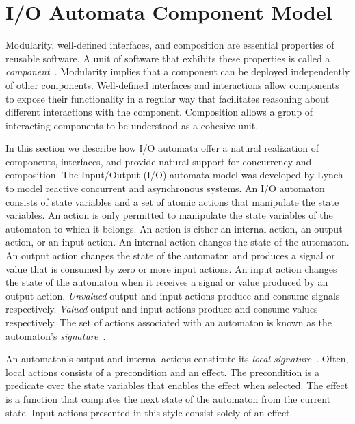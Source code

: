 \section{I/O Automata Component Model\label{system_model}}

Modularity, well-defined interfaces, and composition are essential properties of reusable software.
A unit of software that exhibits these properties is called a \emph{component}~\cite{szyperski2002component}.
Modularity implies that a component can be deployed independently of other components.
Well-defined interfaces and interactions allow components to expose their functionality in a regular way that facilitates reasoning about different interactions with the component.
Composition allows a group of interacting components to be understood as a cohesive unit.

In this section we describe how I/O automata offer a natural realization of components, interfaces, and provide natural support for concurrency and composition.
The Input/Output (I/O) automata model was developed by Lynch~\cite{lynch1996distributed} to model reactive concurrent and asynchronous systems.
An I/O automaton consists of state variables and a set of atomic actions that manipulate the state variables.
An action is only permitted to manipulate the state variables of the automaton to which it belongs.
An action is either an internal action, an output action, or an input action.
An internal action changes the state of the automaton.
An output action changes the state of the automaton and produces a signal or value that is consumed by zero or more input actions.
An input action changes the state of the automaton when it receives a signal or value produced by an output action.
\emph{Unvalued} output and input actions produce and consume signals respectively.
\emph{Valued} output and input actions produce and consume values respectively.
The set of actions associated with an automaton is known as the automaton's \emph{signature}~\cite{lynch1996distributed}.

An automaton's output and internal actions constitute its \emph{local signature}~\cite{lynch1996distributed}.
Often, local actions consists of a precondition and an effect.
The precondition is a predicate over the state variables that enables the effect when selected.
The effect is a function that computes the next state of the automaton from the current state.
Input actions presented in this style consist solely of an effect.

